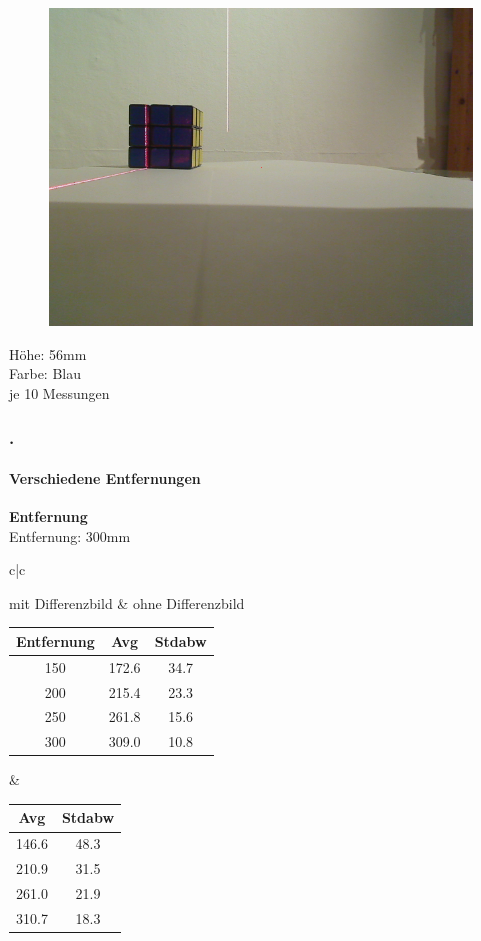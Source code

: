 \documentclass[xcolor=dvipsnames]{beamer}
\def\frametitlesec{\frametitle{\arabic{section}.\hspace{0.5ex}\insertsection}}
\def\framesubtitles#1{\framesubtitle{\hspace{3.5ex}#1}}
\begin{document}
\begin{frame}
\begin{figure}
\begin{minipage}{0.32\linewidth}
		\end{minipage}
		\hfill
		\begin{minipage}{0.32\linewidth}
			\includegraphics[width=\linewidth]{includes/test_dist_3}
		\end{minipage}
	\end{figure}
	Höhe: 56mm\\
	Farbe: Blau\\
	je 10 Messungen
	
\end{frame}

\begin{frame}
	\frametitlesec
	\framesubtitles{Verschiedene Entfernungen}
		\textbf{Entfernung}\\
		
		
		Entfernung: 300mm
		
		\begin{tabular}{c|c}
		
		mit Differenzbild & ohne Differenzbild\\
		
		\begin{tabular}{c|c|c}
Entfernung & Avg & Stdabw\\ \hline
150 &      172.6 & 34.7\\
200 &      215.4 & 23.3\\
250 &      261.8 & 15.6\\
300 &      309.0 & 10.8\\

		\end{tabular}
		&
		\begin{tabular}{c|c}
Avg   & Stdabw\\ \hline
146.6 & 48.3\\
210.9 & 31.5\\
261.0 & 21.9\\
310.7 & 18.3\\
		\end{tabular}
		
		\end{tabular}
		
		
\end{frame}
\end{document}
